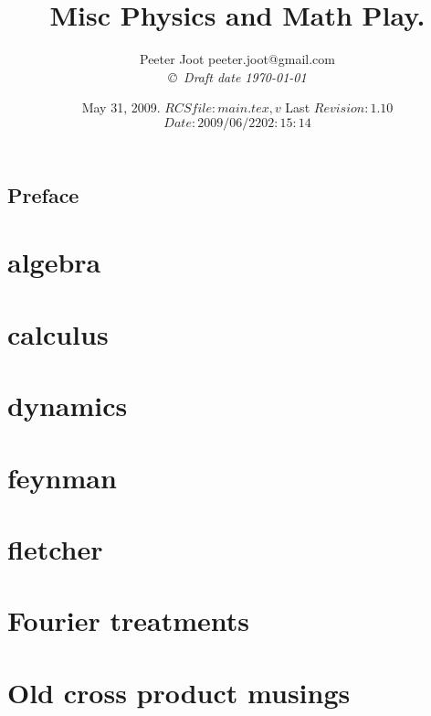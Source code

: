 \documentclass[12pt,leqno]{book}
\title{Misc Physics and Math Play.}
\author{Peeter Joot  \quad peeter.joot@gmail.com \\
{\small\em \copyright \  Draft date \today }}
\date{ May 31, 2009.  $RCSfile: main.tex,v $ Last $Revision: 1.10 $ $Date: 2009/06/22 02:15:14 $ }
\begin{document}
\maketitle
\tableofcontents
\listoffigures
\listoftables
\chapter*{Preface}\normalsize
\pagestyle{plain}

%
\pagestyle{headings}


\part{algebra}





\part{calculus}





\part{dynamics}


\part{feynman}


\part{fletcher}


\part{Fourier treatments}


\part{Old cross product musings}


\end{document}
